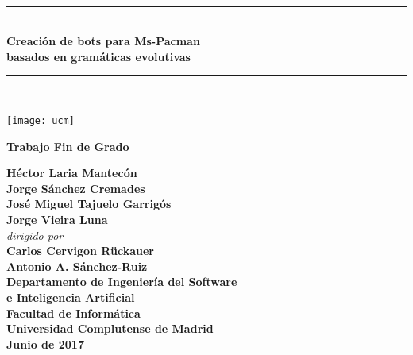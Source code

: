 \thispagestyle{empty}
\begin{titlepage}

\def\titulo{Creación de bots para Ms-Pacman\\ basados en gramáticas evolutivas}
\def\tipo{Trabajo Fin de Grado}
\def\autores{%
Héctor Laria Mantecón\\
Jorge Sánchez Cremades\\
José Miguel Tajuelo Garrigós\\
Jorge Vieira Luna
}
\def\profes{%
Carlos Cervigon Rückauer\\
Antonio A. S\'{a}nchez-Ruiz
}
\def\institucion{%
Departamento de Ingeniería del Software \\e Inteligencia Artificial\\[0.2em]
Facultad de Informática\\[0.2em]
Universidad Complutense de Madrid
}
\def\fecha{Junio de 2017}

\begin{huge}
\mbox{ }
\vfill

\newlength{\longTitulo}
\settowidth{\longTitulo}{%
asdfasdfasdfasdfasdfadfasdfasdfadfasdfasd}%
\begin{center}
\rule{\longTitulo}{.5mm}\\
\vskip 1cm
\textbf{\titulo}
\vskip 0.7cm
\rule{\longTitulo}{.5mm}\\
\end{center}
\end{huge}

\vfill

\begin{center}
\texttt{[image: ucm]}
\end{center}

\vfill

\begin{center}
  {\Large \textbf{\tipo}}
\end{center}

\vfill

\begin{large}

\begin{center}
\textbf{\autores}\\[0.3cm]

\textit{dirigido por}\\[0.3cm]

\textbf{\profes}\\[0.3cm]

\textbf{\institucion}\\[1em]
\textbf{\fecha}

\end{center}

\end{large}

\vfill

\end{titlepage}
